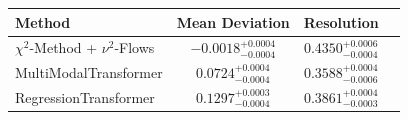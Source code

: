     \begin{tabular}{lccc}
        \toprule
        Method & Mean Deviation & Resolution \\
        \midrule
        $\chi^2$-Method + $\nu^2$-Flows & $-0.0018_{-0.0004}^{+0.0004}$ & $0.4350_{-0.0004}^{+0.0006}$ \\
        MultiModalTransformer & $0.0724_{-0.0004}^{+0.0004}$ & $0.3588_{-0.0006}^{+0.0004}$ \\
        RegressionTransformer & $0.1297_{-0.0004}^{+0.0003}$ & $0.3861_{-0.0003}^{+0.0004}$ \\
        \bottomrule
    \end{tabular}